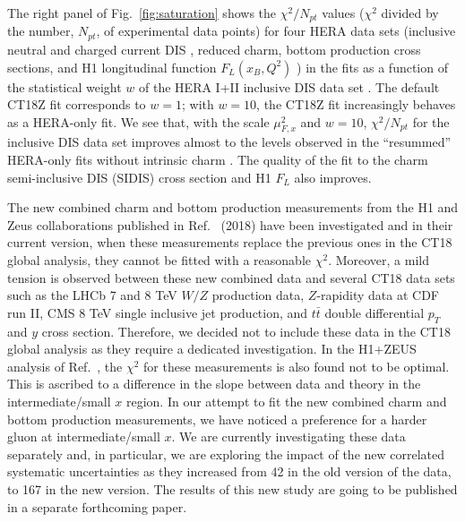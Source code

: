 The right panel of Fig.~\ref{fig:saturation} shows the
$\chi^2/N_{pt}$ values ($\chi^2$ divided by the number, $N_\mathit{pt}$, of experimental data
points) for four HERA data sets (inclusive neutral and charged current DIS
\cite{Abramowicz:2015mha},
reduced charm, bottom production cross sections, and H1 longitudinal function
$F_L(x_B,Q^2)$ \cite{Collaboration:2010ry}) in the fits as a function of the
statistical weight $w$ of the HERA I+II inclusive DIS data set \cite{Abramowicz:2015mha}. The
default CT18Z fit corresponds to $w=1$; with $w=10$, the CT18Z fit
increasingly behaves as a HERA-only fit. We see that, with the scale
$\mu^2_{F,x}$ and $w=10$, $\chi^2/N_{pt}$ for the inclusive DIS data set
improves almost to the levels observed in the ``resummed'' HERA-only fits
without intrinsic charm \cite{Ball:2017otu,Abdolmaleki:2018jln}. The
quality of the fit to the charm semi-inclusive DIS (SIDIS) cross section and H1 $F_L$ also improves.

The new combined charm and bottom production measurements from the H1 and Zeus collaborations published in Ref.~\cite{H1:2018flt} (2018) have been investigated and in their current version, when these measurements replace the previous ones in the CT18 global analysis, they cannot be fitted with a reasonable $\chi^2$.
Moreover, a mild tension is observed between these new combined data and several CT18 data sets such as the LHCb 7 and 8 TeV $W/Z$ production data, $Z$-rapidity data at CDF run II, CMS 8 TeV single inclusive jet production, and $t\bar{t}$ double differential $p_T$ and $y$ cross section. Therefore, we decided not to include these data in the CT18 global analysis as they require a dedicated investigation.
In the H1+ZEUS analysis of Ref.~\cite{H1:2018flt}, the $\chi^2$ for these measurements is also found not to be optimal. This is ascribed to a difference in the slope between data and theory in the intermediate/small $x$ region. In our attempt to fit the new combined charm and bottom production measurements, we have noticed a preference for a harder gluon at intermediate/small $x$.
We are currently investigating these data separately and, in particular, we are exploring the impact of the new correlated systematic uncertainties as they increased from 42 in the old version of the data, to 167 in the new version.
The results of this new study are going to be published in a separate forthcoming paper.



